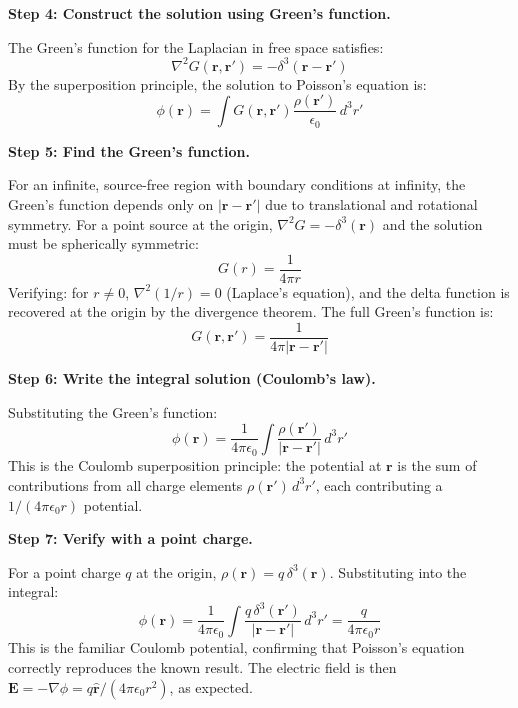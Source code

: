 \textbf{Step 4: Construct the solution using Green's function.}

The Green's function for the Laplacian in free space satisfies:
\begin{equation}
\nabla^2 G(\mathbf{r},\mathbf{r}') = -\delta^3(\mathbf{r} - \mathbf{r}')
\end{equation}
By the superposition principle, the solution to Poisson's equation is:
\begin{equation}
\phi(\mathbf{r}) = \int G(\mathbf{r},\mathbf{r}')\frac{\rho(\mathbf{r}')}{\epsilon_0}\,d^3r'
\end{equation}

\textbf{Step 5: Find the Green's function.}

For an infinite, source-free region with boundary conditions at infinity, the Green's function depends only on $|\mathbf{r} - \mathbf{r}'|$ due to translational and rotational symmetry. For a point source at the origin, $\nabla^2 G = -\delta^3(\mathbf{r})$ and the solution must be spherically symmetric:
\begin{equation}
G(r) = \frac{1}{4\pi r}
\end{equation}
Verifying: for $r \neq 0$, $\nabla^2(1/r) = 0$ (Laplace's equation), and the delta function is recovered at the origin by the divergence theorem. The full Green's function is:
\begin{equation}
G(\mathbf{r},\mathbf{r}') = \frac{1}{4\pi|\mathbf{r} - \mathbf{r}'|}
\end{equation}

\textbf{Step 6: Write the integral solution (Coulomb's law).}

Substituting the Green's function:
\begin{equation}
\phi(\mathbf{r}) = \frac{1}{4\pi\epsilon_0}\int\frac{\rho(\mathbf{r}')}{|\mathbf{r} - \mathbf{r}'|}\,d^3r'
\end{equation}
This is the Coulomb superposition principle: the potential at $\mathbf{r}$ is the sum of contributions from all charge elements $\rho(\mathbf{r}')\,d^3r'$, each contributing a $1/(4\pi\epsilon_0 r)$ potential.

\textbf{Step 7: Verify with a point charge.}

For a point charge $q$ at the origin, $\rho(\mathbf{r}) = q\,\delta^3(\mathbf{r})$. Substituting into the integral:
\begin{equation}
\phi(\mathbf{r}) = \frac{1}{4\pi\epsilon_0}\int\frac{q\,\delta^3(\mathbf{r}')}{|\mathbf{r} - \mathbf{r}'|}\,d^3r' = \frac{q}{4\pi\epsilon_0 r}
\end{equation}
This is the familiar Coulomb potential, confirming that Poisson's equation correctly reproduces the known result. The electric field is then $\mathbf{E} = -\nabla\phi = q\hat{\mathbf{r}}/(4\pi\epsilon_0 r^2)$, as expected.

